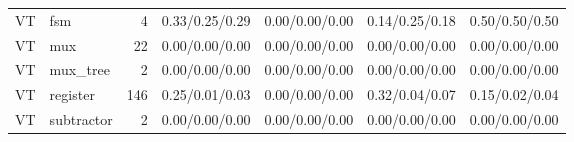 \begin{table}[t]
{\begin{tabular}{@{}llrcccc@{}}
VT & fsm & 4 & 0.33/0.25/0.29 & 0.00/0.00/0.00 & 0.14/0.25/0.18 & 0.50/0.50/0.50 \\
VT & mux & 22 & 0.00/0.00/0.00 & 0.00/0.00/0.00 & 0.00/0.00/0.00 & 0.00/0.00/0.00 \\
VT & mux\_tree & 2 & 0.00/0.00/0.00 & 0.00/0.00/0.00 & 0.00/0.00/0.00 & 0.00/0.00/0.00 \\
VT & register & 146 & 0.25/0.01/0.03 & 0.00/0.00/0.00 & 0.32/0.04/0.07 & 0.15/0.02/0.04 \\
VT & subtractor & 2 & 0.00/0.00/0.00 & 0.00/0.00/0.00 & 0.00/0.00/0.00 & 0.00/0.00/0.00 \\
\bottomrule
\end{tabular}}
\end{table}
